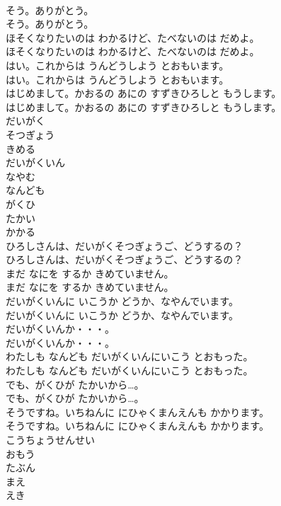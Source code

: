 \documentclass[8pt]{extreport}
\begin{document}
\begin{CJK}{UTF8}{min}
\\	そう。ありがとう。
\\	そう。ありがとう。
\\	ほそくなりたいのは わかるけど、たべないのは だめよ。
\\	ほそくなりたいのは わかるけど、たべないのは だめよ。
\\	はい。これからは うんどうしよう とおもいます。
\\	はい。これからは うんどうしよう とおもいます。
\\	はじめまして。かおるの あにの すずきひろしと もうします。
\\	はじめまして。かおるの あにの すずきひろしと もうします。
\\	だいがく
\\	そつぎょう
\\	きめる
\\	だいがくいん
\\	なやむ
\\	なんども
\\	がくひ
\\	たかい
\\	かかる
\\	ひろしさんは、だいがくそつぎょうご、どうするの？
\\	ひろしさんは、だいがくそつぎょうご、どうするの？
\\	まだ なにを するか きめていません。
\\	まだ なにを するか きめていません。
\\	だいがくいんに いこうか どうか、なやんでいます。
\\	だいがくいんに いこうか どうか、なやんでいます。
\\	だいがくいんか・・・。
\\	だいがくいんか・・・。
\\	わたしも なんども だいがくいんにいこう とおもった。
\\	わたしも なんども だいがくいんにいこう とおもった。
\\	でも、がくひが たかいから…。
\\	でも、がくひが たかいから…。
\\	そうですね。いちねんに にひゃくまんえんも かかります。
\\	そうですね。いちねんに にひゃくまんえんも かかります。
\\	こうちょうせんせい
\\	おもう
\\	たぶん
\\	まえ
\\	えき

\end{CJK}
\end{document}
